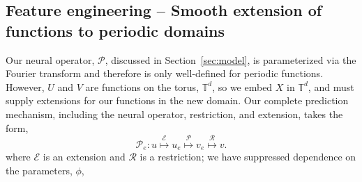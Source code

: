 \subsection{Feature engineering -- Smooth extension of functions to periodic domains}\label{sec:extension}

Our neural operator, $\mathcal{P}$, discussed in Section~\ref{sec:model}, is parameterized via the Fourier transform and therefore is only well-defined for periodic functions. However, $U$ and $V$ are functions on the torus, $\mathbb{T}^d$, so we embed $X$ in $\mathbb{T}^d$, and must supply extensions for our functions in the new domain.  Our complete prediction mechanism, including the neural operator, restriction, and extension, takes the form,
\begin{equation}
    \mathcal{P}_e: u \overset{\mathcal{E}}{\mapsto} u_e \overset{{\mathcal{P}}}{\mapsto} v_e \overset{\mathcal{R}}{\mapsto} v.
\end{equation}
where $\mathcal{E}$ is an extension and $\mathcal{R}$ is a restriction; we have suppressed dependence on the parameters, $\phi$,

